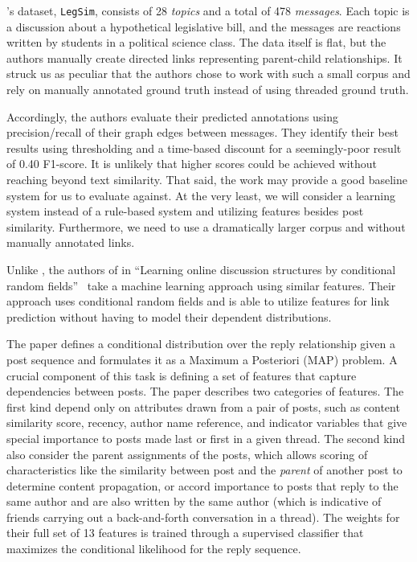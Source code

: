 \documentclass[11pt]{article}
\newcommand{\titlecite}[2]{``#1''~\cite{#2}}
\begin{document}
\cite{Wang2008a}'s dataset, \texttt{LegSim}, consists of 28 \textit{topics} and a total of
478 \textit{messages}. Each topic is a discussion about a hypothetical legislative bill, 
and the messages are reactions written by students in a political science class. 
The data itself is flat, but the authors manually create directed links representing
parent-child relationships. It struck us as peculiar that the authors chose to work
with such a small corpus and rely on manually annotated ground truth instead of using
threaded ground truth.

Accordingly, the authors evaluate their predicted annotations using precision/recall of
their graph edges between messages. They identify their best results using
thresholding and a time-based discount for a seemingly-poor result of 0.40 
F1-score. It is unlikely that higher scores could be achieved without reaching
beyond text similarity. That said, the work may provide a good baseline system
for us to evaluate against. At the very least, we will consider a learning
system instead of a rule-based system and utilizing features besides post
similarity.  Furthermore, we need to use a dramatically larger corpus and without manually
annotated links.

Unlike \cite{Wang2008a}, the authors of in \titlecite{Learning online discussion structures
by conditional random fields}{Wang2011a} take a machine learning approach using
similar features. Their approach uses conditional random
fields and is able to utilize features for link prediction
without having to model their dependent distributions.

The \cite{Wang2011a} paper defines a conditional distribution over the reply
relationship given a post sequence and formulates it as a Maximum a Posteriori
(MAP) problem. A crucial component of this task is defining a set of features
that capture dependencies between posts. The paper describes two categories of
features. The first kind depend only on attributes drawn from a pair
of posts, such as content similarity score, recency, author name reference, and
indicator variables that give special importance to posts made last or first in
a given thread. The second kind also consider the parent assignments of
the posts, which allows scoring of characteristics like the
similarity between  post and the \emph{parent} of another post to determine
content propagation, or accord importance to posts that reply to the same author
and are also written by the same author (which is indicative of friends carrying
out a back-and-forth conversation in a thread). The weights for their full set of
13 features is trained through a supervised classifier that maximizes the
conditional likelihood for the reply sequence.
\end{document}
